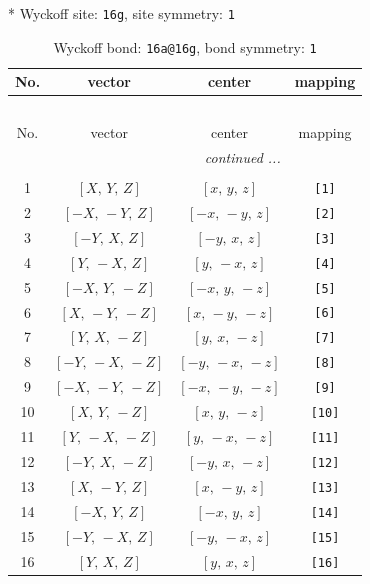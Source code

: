 \documentclass[fleqn,8pt]{jsarticle}
\begin{document}
* Wyckoff site: {\tt 16g}, site symmetry: {\tt 1}
\renewcommand{\arraystretch}{1.2}
\begin{longtable}{cccc}
\caption{Wyckoff bond: {\tt 16a@16g}, bond symmetry: {\tt 1}}
 \\
 \hline \hline
No. & vector & center & mapping \\ \hline \endfirsthead

\multicolumn{3}{l}{\tablename\ \thetable{}} \\
 \hline \hline
No. & vector & center & mapping \\ \hline \endhead

 \hline \hline
\multicolumn{3}{r}{\footnotesize\it continued ...} \\ \endfoot

 \hline \hline
\multicolumn{3}{r}{} \\ \endlastfoot

1 & $\left[ X,\, Y,\, Z \right]$ & $\left[ x,\, y,\, z \right]$ & {\tt [1]} \\ \hline
2 & $\left[ - X,\, - Y,\, Z \right]$ & $\left[ - x,\, - y,\, z \right]$ & {\tt [2]} \\ \hline
3 & $\left[ - Y,\, X,\, Z \right]$ & $\left[ - y,\, x,\, z \right]$ & {\tt [3]} \\ \hline
4 & $\left[ Y,\, - X,\, Z \right]$ & $\left[ y,\, - x,\, z \right]$ & {\tt [4]} \\ \hline
5 & $\left[ - X,\, Y,\, - Z \right]$ & $\left[ - x,\, y,\, - z \right]$ & {\tt [5]} \\ \hline
6 & $\left[ X,\, - Y,\, - Z \right]$ & $\left[ x,\, - y,\, - z \right]$ & {\tt [6]} \\ \hline
7 & $\left[ Y,\, X,\, - Z \right]$ & $\left[ y,\, x,\, - z \right]$ & {\tt [7]} \\ \hline
8 & $\left[ - Y,\, - X,\, - Z \right]$ & $\left[ - y,\, - x,\, - z \right]$ & {\tt [8]} \\ \hline
9 & $\left[ - X,\, - Y,\, - Z \right]$ & $\left[ - x,\, - y,\, - z \right]$ & {\tt [9]} \\ \hline
10 & $\left[ X,\, Y,\, - Z \right]$ & $\left[ x,\, y,\, - z \right]$ & {\tt [10]} \\ \hline
11 & $\left[ Y,\, - X,\, - Z \right]$ & $\left[ y,\, - x,\, - z \right]$ & {\tt [11]} \\ \hline
12 & $\left[ - Y,\, X,\, - Z \right]$ & $\left[ - y,\, x,\, - z \right]$ & {\tt [12]} \\ \hline
13 & $\left[ X,\, - Y,\, Z \right]$ & $\left[ x,\, - y,\, z \right]$ & {\tt [13]} \\ \hline
14 & $\left[ - X,\, Y,\, Z \right]$ & $\left[ - x,\, y,\, z \right]$ & {\tt [14]} \\ \hline
15 & $\left[ - Y,\, - X,\, Z \right]$ & $\left[ - y,\, - x,\, z \right]$ & {\tt [15]} \\ \hline
16 & $\left[ Y,\, X,\, Z \right]$ & $\left[ y,\, x,\, z \right]$ & {\tt [16]} \\
\end{longtable}
\end{document}
